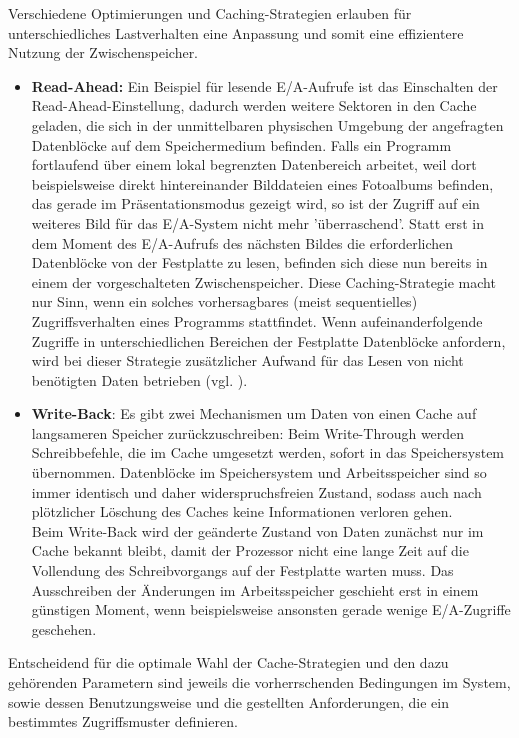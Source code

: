 \documentclass[
	twoside,
	12pt,
	a4paper,
	BCOR10mm,
	DIV14,
	listof=totoc,
	bibliography=totoc,
	headsepline
]{scrreprt}
\begin{document}
Verschiedene Optimierungen und Caching-Strategien erlauben für unterschiedliches Lastverhalten eine Anpassung und somit eine effizientere Nutzung der Zwischenspeicher.
\begin{itemize}
\item \textbf{Read-Ahead:} Ein Beispiel für lesende E/A-Aufrufe ist das Einschalten der Read-Ahead-Einstellung, dadurch werden weitere Sektoren in den Cache geladen, die sich in der unmittelbaren physischen Umgebung der angefragten Datenblöcke auf dem  Speichermedium befinden. Falls ein Programm fortlaufend über einem lokal begrenzten Datenbereich arbeitet, weil dort beispielsweise direkt hintereinander Bilddateien eines Fotoalbums befinden, das gerade im Präsentationsmodus gezeigt wird, so ist der Zugriff auf ein weiteres Bild für das E/A-System nicht mehr 'überraschend'. Statt erst in dem Moment des E/A-Aufrufs des nächsten Bildes die erforderlichen Datenblöcke von der Festplatte zu lesen, befinden sich diese nun bereits in einem der vorgeschalteten Zwischenspeicher. Diese Caching-Strategie macht nur Sinn, wenn ein solches vorhersagbares (meist sequentielles) Zugriffsverhalten eines Programms stattfindet. 
Wenn aufeinanderfolgende Zugriffe in unterschiedlichen Bereichen der Festplatte Datenblöcke anfordern, wird bei dieser Strategie zusätzlicher Aufwand für das Lesen von nicht benötigten Daten betrieben (vgl. \cite{corbet2015}). 
\item \textbf{Write-Back}: Es gibt zwei Mechanismen um Daten von einen Cache auf langsameren Speicher zurückzuschreiben:
Beim Write-Through werden Schreibbefehle, die im Cache umgesetzt werden, sofort in das Speichersystem übernommen. Datenblöcke im Speichersystem und Arbeitsspeicher sind so immer identisch und daher widerspruchsfreien Zustand, sodass auch nach plötzlicher Löschung des Caches keine Informationen verloren gehen.\\
Beim Write-Back wird der geänderte Zustand von Daten zunächst nur im Cache bekannt bleibt, damit der Prozessor nicht eine lange Zeit auf die Vollendung des Schreibvorgangs auf der Festplatte warten muss. Das Ausschreiben der Änderungen im Arbeitsspeicher geschieht erst in einem günstigen Moment, wenn beispielsweise ansonsten gerade wenige E/A-Zugriffe geschehen.
\end{itemize}
Entscheidend für die optimale Wahl der Cache-Strategien und den dazu gehörenden Parametern sind jeweils die vorherrschenden Bedingungen im System, sowie dessen Benutzungsweise und die gestellten Anforderungen, die ein bestimmtes Zugriffsmuster definieren.
\end{document}
